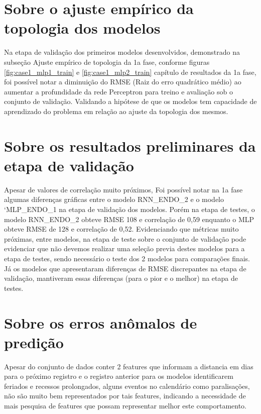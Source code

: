 \documentclass[	12pt, Times, openright, twoside, a4paper, english, brazil]{abntex2}
\begin{document}
    \section{Sobre o ajuste empírico da topologia dos modelos}
        Na etapa de validação dos primeiros modelos desenvolvidos, demonstrado na subseção Ajuste empírico de topologia da 1a fase, conforme figuras \ref{fig:case1_mlp1_train} e \ref{fig:case1_mlp2_train} capítulo de resultados da 1a fase, foi possível notar a diminuição do RMSE (Raiz do erro quadrático médio) ao aumentar a profundidade da rede Perceptron para treino e avaliação sob o conjunto de validação. Validando a hipótese de que os modelos tem capacidade de aprendizado do problema em relação ao ajuste da topologia dos mesmos.
        
    \section{Sobre os resultados preliminares da etapa de validação}
        Apesar de valores de correlação muito próximos, Foi possível notar na 1a fase algumas diferenças gráficas entre o modelo RNN\_ENDO\_2 e o modelo `MLP\_ENDO\_1 na etapa de validação dos modelos.  Porém na etapa de testes, o modelo  RNN\_ENDO\_2 obteve RMSE 108 e correlação de 0,59 enquanto o MLP obteve RMSE de 128 e correlação de 0,52. Evidenciando que métricas muito próximas, entre modelos, na etapa de teste sobre o conjunto de validação pode evidenciar que não devemos realizar uma seleção previa destes modelos para a etapa de testes, sendo necessário o teste dos 2 modelos para comparações finais. Já os modelos que apresentaram diferenças de RMSE discrepantes na etapa de validação, mantiveram essas diferenças (para o pior e o melhor) na etapa de testes.

    \section{Sobre os erros anômalos de predição}
        Apesar do conjunto de dados conter 2 features que informam a distancia em dias para o próximo registro e o registro anterior para os modelos identificarem feriados e recessos prolongados, alguns eventos no calendário como paralisações, não são muito bem representados por tais features, indicando a necessidade de mais pesquisa de features que possam representar melhor este comportamento.
\end{document}

